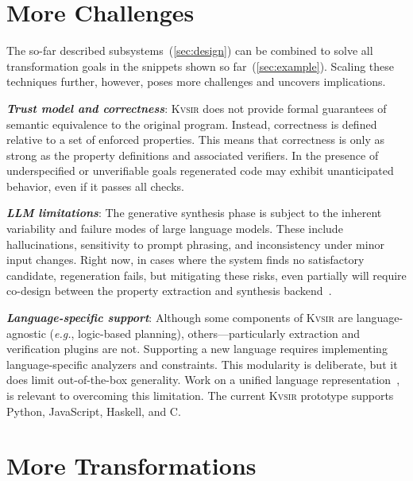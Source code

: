 \documentclass[sigplan,review,anonymous,10pt]{acmart}
\def\eg{{\em e.g.}, }
\newcommand{\sys}{{\scshape Kv{\textalpha}sir}\xspace}
\newcommand{\heading}[1]{\vspace{2pt}\noindent\textbf{\emph{#1}}:\enspace}
\begin{document}


\section{More Challenges}
\label{sec:limitations}

The so-far 
described subsystems~(\cref{sec:design}) can be combined to solve all transformation
goals in the snippets shown so far~(\cref{sec:example}).
Scaling these techniques further, however, poses more challenges and uncovers implications.


\heading{Trust model and correctness}
\sys
does not provide formal guarantees
of semantic equivalence
to the original program.
Instead,
correctness is defined relative to a set of enforced properties.
This means that correctness is only as strong as the property definitions and associated verifiers.
In the presence of underspecified or unverifiable goals
regenerated code
may exhibit unanticipated behavior,
even if it passes all checks. 

\heading{LLM limitations}
The generative synthesis phase
is subject to the inherent variability and failure modes
of large language models.
These include hallucinations,
sensitivity to prompt phrasing,
and inconsistency
under minor input changes.
Right now, in cases where the system finds no satisfactory candidate, regeneration fails,
but mitigating these risks, even partially will 
require co-design between the property extraction and synthesis backend~\cite{banerjee2025crane}.

\heading{Language-specific support}
Although some components of \sys are language-agnostic (\eg logic-based planning),
others---particularly extraction and verification plugins are not.
Supporting a new language
requires implementing language-specific analyzers and constraints.
This modularity is deliberate,
but it does limit out-of-the-box generality.
Work on a unified language representation~\cite{koppel2018onetool,bap2011,dillig2009sail},
is relevant to overcoming this limitation.
The current \sys prototype
supports Python, JavaScript, Haskell, and C. 



\section{More Transformations}
\label{sec:discussion}
\end{document}
